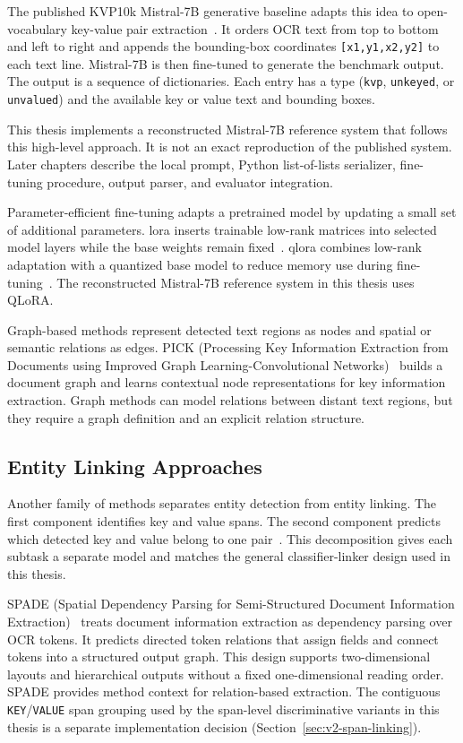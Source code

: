 The published KVP10k Mistral-7B generative baseline adapts this idea to
open-vocabulary key-value pair extraction~\cite{kvp10k,mistral}. It orders OCR
text from top to bottom and left to right and appends the bounding-box
coordinates \texttt{[x1,y1,x2,y2]} to each text line. Mistral-7B is then
fine-tuned to generate the benchmark output. The output is a sequence of
dictionaries. Each entry has a type (\texttt{kvp}, \texttt{unkeyed}, or
\texttt{unvalued}) and the available key or value text and bounding boxes.

This thesis implements a reconstructed Mistral-7B reference system that follows
this high-level approach. It is not an exact reproduction of the published
system. Later chapters describe the local prompt, Python list-of-lists
serializer, fine-tuning procedure, output parser, and evaluator integration.

Parameter-efficient fine-tuning adapts a pretrained model by updating a small
set of additional parameters. \Gls{lora} inserts trainable low-rank matrices
into selected model layers while the base weights remain fixed~\cite{lora}.
\Gls{qlora} combines low-rank adaptation with a quantized base model to reduce
memory use during fine-tuning~\cite{qlora}. The reconstructed Mistral-7B
reference system in this thesis uses QLoRA.

Graph-based methods represent detected text regions as nodes and spatial or
semantic relations as edges. PICK (Processing Key Information Extraction from
Documents using Improved Graph Learning-Convolutional Networks)~\cite{pick}
builds a document graph and learns contextual node representations for key
information extraction. Graph methods can model relations between distant text
regions, but they require a graph definition and an explicit relation
structure.

\subsection{Entity Linking Approaches}
\label{subsec:entity_linking}

Another family of methods separates entity detection from entity linking. The
first component identifies key and value spans. The second component predicts
which detected key and value belong to one pair~\cite{spade,bros}. This
decomposition gives each subtask a separate model and matches the general
classifier-linker design used in this thesis.

SPADE (Spatial Dependency Parsing for Semi-Structured Document Information
Extraction)~\cite{spade} treats document information extraction as dependency
parsing over OCR tokens. It predicts directed token relations that assign
fields and connect tokens into a structured output graph. This design supports
two-dimensional layouts and hierarchical outputs without a fixed
one-dimensional reading order. SPADE provides method context for relation-based
extraction. The contiguous \texttt{KEY}/\texttt{VALUE} span grouping used by
the span-level discriminative variants in this thesis is a separate
implementation decision (Section~\ref{sec:v2-span-linking}).

